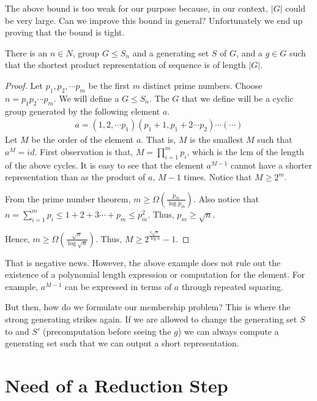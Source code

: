 The above bound is too weak for our purpose because, in our context, $|G|$ could be very large. Can we improve this bound in general?
Unfortunately we end up proving that the bound is tight.

\begin{proposition}
There is an $n \in N$, group $G \le S_n$ and a generating set $S$ of $G$, and a $g \in G$ such that the shortest product representation of 
sequence is of length $|G|$.
\end{proposition}
\begin{proof}
Let $p_1, p_2, \cdots p_m$ be the first $m$ distinct prime numbers.
Choose $n = p_1p_2 \cdots p_m$. We will define a $G \le S_n$. The $G$ that we define will be a cyclic group generated by the following element $a$.
\begin{align}
a = (1, 2, \cdots p_1) (p_1+1, p_1+2 \cdots p_2) \cdots (\cdots)
\end{align}
Let $M$ be the order of the element $a$. That is, $M$ is the smallest $M$ such that $a^M = id$. First observation is that, $M = \prod\limits_{i=1}^m p_i$, which is the lcm of the length of the above cycles. It is easy to see that the element $a^{M-1}$ cannot have a shorter representation than as the product of $a$, $M-1$ times. Notice that $M \ge 2^m$.

From the prime number theorem, $m \geq \Omega(\frac{p_m}{\log p_m})$.
Also notice that $n = \sum\limits_{i = 1}^m p_i \leq 1 + 2 + 3 \cdots + p_m \leq p_m^2$. Thus, $p_m \geq \sqrt n$.

Hence, $m \geq \Omega(\frac{\sqrt n}{\log \sqrt n})$. Thus, $M \geq 2^{\frac{c \sqrt n}{\log n }} - 1$.
\end{proof}

That is negative news. However, the above example does not rule out the existence of a polynomial length expression or computation for the element. For example, $a^{M-1}$ can be expressed in terms of
$a$ through repeated squaring.

But then, how do we formulate our membership problem? This is where the strong generating strikes again. If we are allowed to change the generating set $S$ to and $S'$ (precomputation before seeing the $g$) we can always compute a generating set such that we can output a short representation. 


\section{Need of a Reduction Step}

